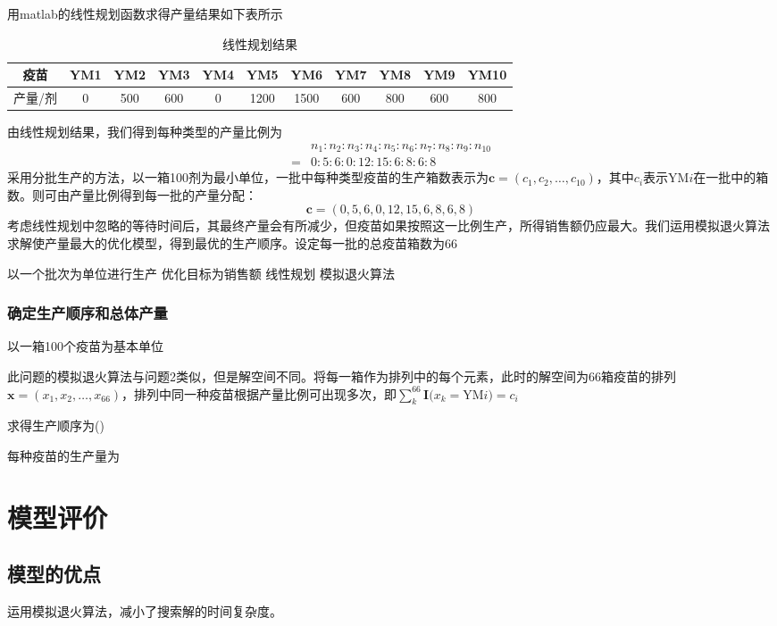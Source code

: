 \documentclass[UTF8]{ctexart}
\begin{document}
	用matlab的线性规划函数求得产量结果如下表所示
	\begin{table}[H]
		\centering
		\caption{线性规划结果}
		\begin{tabular}{ c| c| c |c|c|c|c|c|c|c|c}
			\hline
			疫苗 & YM1 & YM2 & YM3 & YM4 & YM5 & YM6 & YM7 & YM8 & YM9 & YM10 \\
			\hline
			 产量/剂 & 0 & 500 & 600 & 0 & 1200 & 1500 & 600 & 800 & 600 & 800 \\
			 \hline
		\end{tabular}
	\end{table}
	\par 由线性规划结果，我们得到每种类型的产量比例为
	\begin{equation}
	\begin{split}
	&n_1:n_2:n_3:n_4:n_5:n_6:n_7:n_8:n_9:n_{10}\\
	=&0:5:6:0:12:15:6:8:6:8
	\end{split}
	\end{equation}
	采用分批生产的方法，以一箱100剂为最小单位，一批中每种类型疫苗的生产箱数表示为$\boldsymbol{c}=(c_{1},c_{2},\dots,c_{10})$，其中$c_{i}$表示YM$i$在一批中的箱数。则可由产量比例得到每一批的产量分配：
	\begin{equation}
		\boldsymbol{c}=(0,5,6,0,12,15,6,8,6,8)
	\end{equation}
	考虑线性规划中忽略的等待时间后，其最终产量会有所减少，但疫苗如果按照这一比例生产，所得销售额仍应最大。我们运用模拟退火算法求解使产量最大的优化模型，得到最优的生产顺序。设定每一批的总疫苗箱数为66
	\par 以一个批次为单位进行生产
	优化目标为销售额
	线性规划
	模拟退火算法
	\subsubsection{确定生产顺序和总体产量}
	以一箱100个疫苗为基本单位
	\par 此问题的模拟退火算法与问题2类似，但是解空间不同。将每一箱作为排列中的每个元素，此时的解空间为66箱疫苗的排列$\boldsymbol{x}=(x_{1},x_{2},\dots,x_{66})$，排列中同一种疫苗根据产量比例可出现多次，即$\sum_{k}^{66}\boldsymbol{I}(x_{k}=$YM$i)=c_{i}$
	\par 求得生产顺序为()
	\par 每种疫苗的生产量为
	
	
	\section{模型评价}
	\subsection{模型的优点}
	运用模拟退火算法，减小了搜索解的时间复杂度。
\end{document}
